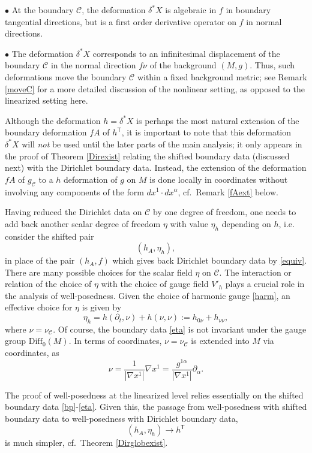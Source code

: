 \documentclass[10pt]{amsart}
\renewcommand{\a}{\alpha}
\renewcommand{\d}{\delta}
\newcommand{\cC}{{\mathcal C}}
\newcommand{\Diff}{\mathrm{Diff}}
\newcommand{\tT}{\mathsf{T}}
\newcommand{\be}{\begin{equation}}
\newcommand{\ee}{\end{equation}}
\newcommand{\p}{\partial}
\renewcommand{\to}{\rightarrow}
\newcommand{\<}{\langle}
\renewcommand{\>}{\rangle}
\theoremstyle{plain}
\theoremstyle{remark}
\theoremstyle{definition}
\numberwithin{equation}{section}
\begin{document}
$\bullet$ At the boundary $\cC$, the deformation $\d^*X$ is algebraic in $f$ in boundary tangential directions, but is a first order 
derivative operator on $f$ in normal directions. 

$\bullet$ The deformation $\d^*X$ corresponds to an infinitesimal displacement of the boundary $\cC$ in the normal 
direction $f\nu$ of the background $(M, g)$. Thus, such deformations move the boundary $\cC$ within a fixed background metric; 
see Remark \ref{moveC} for a more detailed discussion of the nonlinear setting, as opposed to the linearized setting here. 

   Although the deformation $h = \d^*X$ is perhaps the most natural extension of the boundary deformation $fA$ of $h^{\tT}$, it is important to 
note that this deformation $\d^*X$ will {\it not} be used until the later parts of the main analysis; it only appears in the proof of Theorem \ref{Direxist} 
relating the shifted boundary data (discussed next) with the Dirichlet boundary data. Instead, the extension of the deformation $fA$ of $g_{\cC}$ 
to a $h$ deformation of $g$ on $M$ is done locally in coordinates without involving any components of the form $dx^1\cdot dx^{\a}$, 
cf.~Remark \ref{fAext} below. 

  Having reduced the Dirichlet data on $\cC$ by one degree of freedom, one needs to add back another scalar degree of freedom $\eta$ 
with value $\eta_h$ depending on $h$, i.e.~ consider the shifted pair 
\be \label{bp}
(h_A, \eta_h),
\ee
in place of the pair $(h_A, f)$ which gives back Dirichlet boundary data by \eqref{equiv}. There are many possible choices for the scalar field $\eta$ on $\cC$. 
The interaction or relation of the choice of $\eta$ with the choice of gauge field $V'_h$ plays a crucial role in the analysis of well-posedness. 
Given the choice of harmonic gauge \eqref{harm}, an effective choice for $\eta$ is given by 
\be \label{eta}
\eta_h = h(\p_t, \nu) + h(\nu,\nu) := h_{0\nu} + h_{\nu \nu},
\ee
where $\nu = \nu_{\cC}$. Of course, the boundary data \eqref{eta} is not invariant under the gauge group $\Diff_0(M)$. In terms of coordinates, 
$\nu = \nu_{\cC}$ is extended into $M$ via coordinates, as 
$$\nu = \frac{1}{|\nabla x^1|}\nabla x^1 = \frac{g^{1\a}}{|\nabla x^1|} \p_{\a}.$$

  The proof of well-posedness at the linearized level relies essentially on the shifted boundary data \eqref{bp}-\eqref{eta}. Given this, the 
passage from well-posedness with shifted boundary data to well-posedness with Dirichlet boundary data, 
$$(h_A, \eta_h) \to h^{\tT}$$
is much simpler, cf.~Theorem \ref{Dirglobexist}.  
\end{document}
